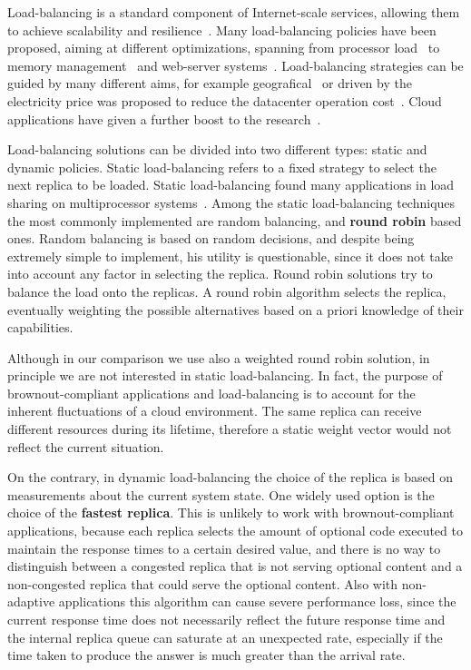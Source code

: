 Load-balancing is a standard component of Internet-scale services,
allowing them to achieve scalability and
resilience~\citep{Barroso09,Hamilton07:LISA,clusteredbalancing}.  Many
load-balancing policies have been proposed, aiming at different
optimizations, spanning from processor load~\cite{Stankovic:TC} to
memory management~\cite{PattersonMemoryLB,MemoryLBACC} and web-server
systems~\cite{Cardellini2003}. Load-balancing strategies can be guided
by many different aims, for example geografical~\cite{GeograficalSASO}
or driven by the electricity price was proposed to reduce the
datacenter operation
cost~\cite{LoadBalancingForElectricity:TCC}. Cloud applications have
given a further boost to the
research~\citep{Barroso09,Lu11:PerfEval,Lin12:IGCC}.

Load-balancing solutions can be divided into two different types:
static and dynamic policies. Static load-balancing refers to a fixed
strategy to select the next replica to be loaded. Static
load-balancing found many applications in load sharing on
multiprocessor
systems~\cite{StaticLoadBalancing:TSE,StaticOptimal:ACM}. Among the
static load-balancing techniques the most commonly implemented are
random balancing, and \textbf{round robin} based ones. Random
balancing is based on random decisions, and despite being extremely
simple to implement, his utility is questionable, since it does not
take into account any factor in selecting the replica. Round robin
solutions try to balance the load onto the replicas. A round robin
algorithm selects the replica, eventually weighting the possible
alternatives based on a priori knowledge of their capabilities.

Although in our comparison we use also a weighted round robin
solution, in principle we are not interested in static
load-balancing. In fact, the purpose of brownout-compliant
applications and load-balancing is to account for the inherent
fluctuations of a cloud environment. The same replica can receive
different resources during its lifetime, therefore a static weight
vector would not reflect the current situation.

On the contrary, in dynamic load-balancing the choice of the replica
is based on measurements about the current system state. One widely
used option is the choice of the \textbf{fastest replica}. This is
unlikely to work with brownout-compliant applications, because each
replica selects the amount of optional code executed to maintain the
response times to a certain desired value, and there is no way to
distinguish between a congested replica that is not serving optional
content and a non-congested replica that could serve the optional
content. Also with non-adaptive applications this algorithm can cause
severe performance loss, since the current response time does not
necessarily reflect the future response time and the internal replica
queue can saturate at an unexpected rate, especially if the time taken
to produce the answer is much greater than the arrival rate.

